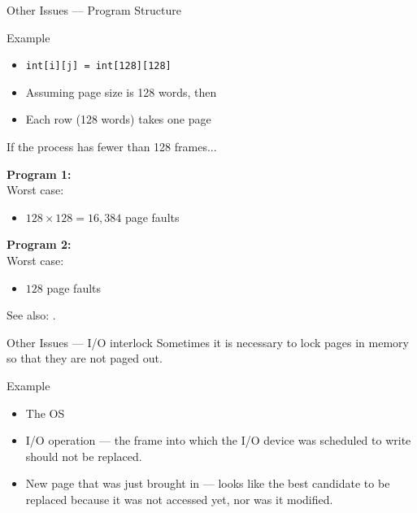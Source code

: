 \begin{frame}{Other Issues --- Program Structure}
  \begin{block}{Example}
    \begin{itemize}
    \item \texttt{int[i][j] = int[128][128]}
    \item Assuming page size is 128 words, then
    \item Each row (128 words) takes one page
    \end{itemize}
    If the process has fewer than 128 frames...\\[1ex]
    \begin{minipage}[t]{.5\linewidth}
      \textbf{Program 1:}\\[1ex]
      \mode<beamer>{ \texttt{[image: mm-pagefault]} }%
       Worst case:
      \begin{itemize}
      \item[] $128 \times 128 = 16,384$ page faults
      \end{itemize}
    \end{minipage}\qquad
    \begin{minipage}[t]{.4\linewidth}
      \textbf{Program 2:}\\[1ex]
      \mode<beamer>{ \texttt{[image: mm-pagefault2]} }%
       Worst case:
      \begin{itemize}
      \item[] $128$ page faults
      \end{itemize}
    \end{minipage}
  \end{block}
\end{frame}

See also: .

\begin{frame}{Other Issues --- I/O interlock}
  Sometimes it is necessary to lock pages in memory so that they are not paged out.
  \begin{block}{Example}
    \begin{itemize}
    \item The OS
    \item I/O operation --- the frame into which the I/O device was scheduled to write
      should not be replaced.
    \item New page that was just brought in --- looks like the best candidate to be
      replaced because it was not accessed yet, nor was it modified.
    \end{itemize}
  \end{block}
\end{frame}

